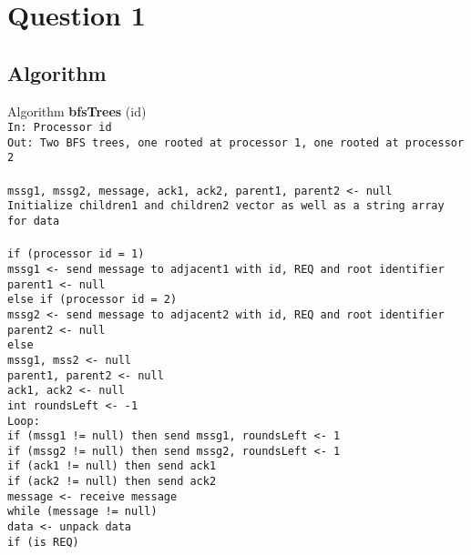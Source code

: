 \documentclass[12pt,letterpaper]{article}
\begin{document}
\newpage
\section*{Question 1}
\subsection* {Algorithm}
Algorithm \textbf{bfsTrees} (id)\\
\texttt {In: Processor id\\
\texttt Out: Two BFS trees, one rooted at processor 1, one rooted at processor 2\\ \\
\texttt mssg1, mssg2, message, ack1, ack2, parent1, parent2 <- null \\
\texttt Initialize children1 and children2 vector as well as a string array for data \\ \\
\texttt if (processor id = 1) \\
\hphantom{~~~~} mssg1 <- send message to adjacent1 with id, REQ and root identifier \\
\hphantom{~~~~} parent1 <- null \\
\texttt else if (processor id = 2) \\
\hphantom{~~~~} mssg2 <- send message to adjacent2 with id, REQ and root identifier \\
\hphantom{~~~~} parent2 <- null \\
\texttt else \\
\hphantom{~~~~} mssg1, mss2 <- null \\
\hphantom{~~~~} parent1, parent2 <- null \\
\texttt ack1, ack2 <- null \\
\texttt int roundsLeft <- -1 \\
\texttt Loop: \\
\texttt if (mssg1 != null) then send mssg1, roundsLeft <- 1 \\
\texttt if (mssg2 != null) then send mssg2, roundsLeft <- 1 \\
\texttt if (ack1 != null) then send ack1 \\
\texttt if (ack2 != null) then send ack2 \\
\texttt message <- receive message \\
\texttt while (message != null) \\
\hphantom{~~~~} data <- unpack data \\
\hphantom{~~~~} if (is REQ) \\
}
\end{document}
